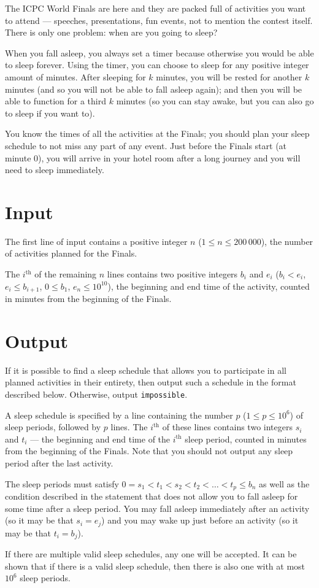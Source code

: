 
The ICPC World Finals are here and they are packed full of activities you want to attend --- speeches, presentations, fun events, not to mention the contest itself. 
There is only one problem: when are you going to sleep?

When you fall asleep, you always set a timer because otherwise you would be able to sleep forever. Using the timer, you can choose to sleep for any positive integer amount of minutes. After sleeping for $k$ minutes, you will be rested for another
$k$ minutes (and so you will not be able to fall asleep again); and then you
will be able to function for a third $k$ minutes (so you can stay awake, but
you can also go to sleep if you want to).

You know the times of all the activities at the Finals; you should plan your sleep schedule to not miss any part of any event.
Just before the Finals start (at minute $0$), you will arrive in your hotel room after a long journey and you will need to sleep immediately.

\section*{Input}
The first line of input contains a positive integer $n$ ($1\leq n \leq 200\,000$),
the number of activities planned for the Finals. 

The $i^{\text{th}}$ of the remaining $n$ lines contains two positive integers $b_i$ and $e_i$ ($b_i < e_i$,
$e_i \le b_{i+1}$, $0 \le b_1$, $e_n \leq 10^{10}$), the beginning and end time
of the activity, counted in minutes from the beginning of the Finals.

\section*{Output}
If it is possible to find a sleep schedule that allows you to participate in all planned activities in their entirety, then output such a schedule in the format described below. Otherwise, output \texttt{impossible}.

A sleep schedule is specified by a line containing the number $p$ ($1 \le
p \le 10^6$) of sleep periods, followed by $p$ lines.  The  $i^{\text{th}}$ of these lines contains two integers $s_i$ and $t_i$ --- the beginning and end time of the $i^{\text{th}}$ sleep period, counted in minutes from the beginning of the Finals. Note that you should not output any sleep period after the last activity.

The sleep periods must satisfy $0 = s_1 < t_1 < s_2 < t_2 < \ldots < t_p \leq b_n$ as well as the condition described in the statement that does not allow you to fall asleep for some time after a sleep period. You may fall asleep immediately after an activity (so it may be that $s_i=e_j$) and you may wake up just before an activity (so it may be that $t_i=b_j$).

If there are multiple valid sleep schedules, any one will be accepted. It can be shown that if there is a valid sleep schedule, then there is also one with at most $10^6$ sleep periods.

